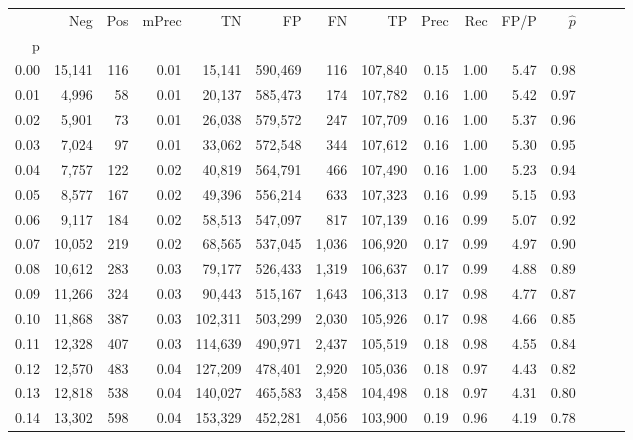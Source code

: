 \begin{tabular}{rrrrrrrrrrrrrrr}
\toprule
{} &     Neg &    Pos & mPrec &       TN &       FP &       FN &       TP &  Prec &   Rec &  FP/P & $\hat{p}$ \\
p    &         &        &       &          &          &          &          &       &       &       &           \\
\midrule
0.00 &  15,141 &    116 &  0.01 &   15,141 &  590,469 &      116 &  107,840 &  0.15 &  1.00 &  5.47 &      0.98 \\
0.01 &   4,996 &     58 &  0.01 &   20,137 &  585,473 &      174 &  107,782 &  0.16 &  1.00 &  5.42 &      0.97 \\
0.02 &   5,901 &     73 &  0.01 &   26,038 &  579,572 &      247 &  107,709 &  0.16 &  1.00 &  5.37 &      0.96 \\
0.03 &   7,024 &     97 &  0.01 &   33,062 &  572,548 &      344 &  107,612 &  0.16 &  1.00 &  5.30 &      0.95 \\
0.04 &   7,757 &    122 &  0.02 &   40,819 &  564,791 &      466 &  107,490 &  0.16 &  1.00 &  5.23 &      0.94 \\
0.05 &   8,577 &    167 &  0.02 &   49,396 &  556,214 &      633 &  107,323 &  0.16 &  0.99 &  5.15 &      0.93 \\
0.06 &   9,117 &    184 &  0.02 &   58,513 &  547,097 &      817 &  107,139 &  0.16 &  0.99 &  5.07 &      0.92 \\
0.07 &  10,052 &    219 &  0.02 &   68,565 &  537,045 &    1,036 &  106,920 &  0.17 &  0.99 &  4.97 &      0.90 \\
0.08 &  10,612 &    283 &  0.03 &   79,177 &  526,433 &    1,319 &  106,637 &  0.17 &  0.99 &  4.88 &      0.89 \\
0.09 &  11,266 &    324 &  0.03 &   90,443 &  515,167 &    1,643 &  106,313 &  0.17 &  0.98 &  4.77 &      0.87 \\
0.10 &  11,868 &    387 &  0.03 &  102,311 &  503,299 &    2,030 &  105,926 &  0.17 &  0.98 &  4.66 &      0.85 \\
0.11 &  12,328 &    407 &  0.03 &  114,639 &  490,971 &    2,437 &  105,519 &  0.18 &  0.98 &  4.55 &      0.84 \\
0.12 &  12,570 &    483 &  0.04 &  127,209 &  478,401 &    2,920 &  105,036 &  0.18 &  0.97 &  4.43 &      0.82 \\
0.13 &  12,818 &    538 &  0.04 &  140,027 &  465,583 &    3,458 &  104,498 &  0.18 &  0.97 &  4.31 &      0.80 \\
0.14 &  13,302 &    598 &  0.04 &  153,329 &  452,281 &    4,056 &  103,900 &  0.19 &  0.96 &  4.19 &      0.78 \\

\end{tabular}
